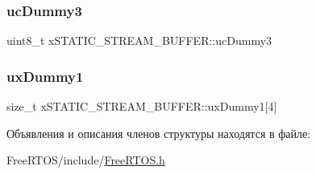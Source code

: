 \subsubsection{\texorpdfstring{ucDummy3}{ucDummy3}}
{\footnotesize\ttfamily uint8\+\_\+t x\+S\+T\+A\+T\+I\+C\+\_\+\+S\+T\+R\+E\+A\+M\+\_\+\+B\+U\+F\+F\+E\+R\+::uc\+Dummy3}

\mbox{\label{structx_s_t_a_t_i_c___s_t_r_e_a_m___b_u_f_f_e_r_a9020496ea46d0d95451ed11b3193fa09}} 
\subsubsection{\texorpdfstring{uxDummy1}{uxDummy1}}
{\footnotesize\ttfamily size\+\_\+t x\+S\+T\+A\+T\+I\+C\+\_\+\+S\+T\+R\+E\+A\+M\+\_\+\+B\+U\+F\+F\+E\+R\+::ux\+Dummy1\mbox{[}4\mbox{]}}



Объявления и описания членов структуры находятся в файле\+:\begin{DoxyCompactItemize}
\item 
Free\+R\+T\+O\+S/include/\mbox{\hyperlink{_free_r_t_o_s_8h}{Free\+R\+T\+O\+S.\+h}}\end{DoxyCompactItemize}
